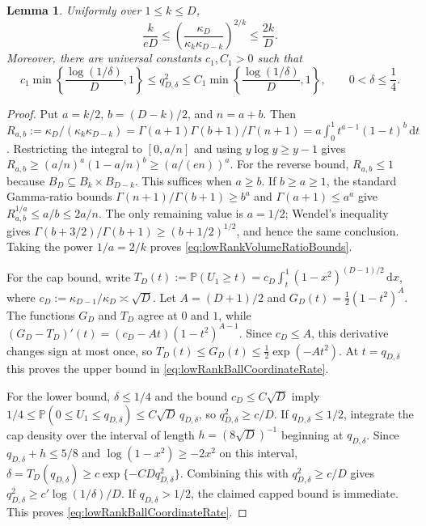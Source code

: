 \documentclass[11pt]{article}
\newtheorem{lemma}[theorem]{Lemma}
\theoremstyle{definition}
\theoremstyle{remark}
\newcommand{\1}{\boldsymbol{1}}
\begin{document}
\begin{lemma}
\label{lem:ballVolumeAndCapBounds}
Uniformly over $1\leq k\leq D$,
\begin{equation}
\frac{k}{eD}
\leq
\left(
\frac{\kappa_D}{\kappa_k\kappa_{D-k}}
\right)^{2/k}
\leq
\frac{2k}{D}.
\label{eq:lowRankVolumeRatioBounds}
\end{equation}
Moreover, there are universal constants $c_1,C_1>0$ such that
\begin{equation}
c_1\min\left\{\frac{\log(1/\delta)}D,1\right\}
\leq
q_{D,\delta}^2
\leq
C_1\min\left\{\frac{\log(1/\delta)}D,1\right\},
\qquad
0<\delta\leq\frac14.
\label{eq:lowRankBallCoordinateRate}
\end{equation}
\end{lemma}

\begin{proof}
Put $a=k/2$, $b=(D-k)/2$, and $n=a+b$. Then
\(R_{a,b}:=\kappa_D/(\kappa_k\kappa_{D-k})
=\Gamma(a+1)\Gamma(b+1)/\Gamma(n+1)
=a\int_0^1t^{a-1}(1-t)^b\,\mathrm dt\).
Restricting the integral to $[0,a/n]$ and using
$y\log y\geq y-1$ gives
\(R_{a,b}\geq(a/n)^a(1-a/n)^b\geq(a/(en))^a\).
For the reverse bound, $R_{a,b}\leq1$ because
$B_D\subseteq B_k\times B_{D-k}$. This suffices when $a\geq b$. If
$b\geq a\geq1$, the standard Gamma-ratio bounds
\(\Gamma(n+1)/\Gamma(b+1)\geq b^a\) and
\(\Gamma(a+1)\leq a^a\) give
\(R_{a,b}^{1/a}\leq a/b\leq2a/n\).
The only remaining value is $a=1/2$; Wendel's inequality gives
\(\Gamma(b+3/2)/\Gamma(b+1)\geq(b+1/2)^{1/2}\),
and hence the same conclusion. Taking the power $1/a=2/k$ proves
\eqref{eq:lowRankVolumeRatioBounds}.

For the cap bound, write
\(T_D(t):=\mathbb P(U_1\geq t)
=c_D\int_t^1(1-x^2)^{(D-1)/2}\,\mathrm dx\), where
\(c_D:=\kappa_{D-1}/\kappa_D\asymp\sqrt D\).
Let $A=(D+1)/2$ and $G_D(t)=\tfrac12(1-t^2)^A$. The functions
$G_D$ and $T_D$ agree at $0$ and $1$, while
\((G_D-T_D)'(t)=(c_D-At)(1-t^2)^{A-1}\).
Since $c_D\leq A$, this derivative changes sign at most once, so
\(T_D(t)\leq G_D(t)\leq\frac12\exp(-At^2)\).
At $t=q_{D,\delta}$ this proves the upper bound in
\eqref{eq:lowRankBallCoordinateRate}.

For the lower bound, $\delta\leq1/4$ and the bound
$c_D\leq C\sqrt D$ imply
\(1/4\leq\mathbb P(0\leq U_1\leq q_{D,\delta})
\leq C\sqrt D\,q_{D,\delta}\),
so $q_{D,\delta}^2\geq c/D$. If $q_{D,\delta}\leq1/2$, integrate the
cap density over the interval of length $h=(8\sqrt D)^{-1}$ beginning at
$q_{D,\delta}$. Since $q_{D,\delta}+h\leq5/8$ and
$\log(1-x^2)\geq-2x^2$ on this interval,
\(\delta=T_D(q_{D,\delta})\geq
c\exp\{-CDq_{D,\delta}^2\}\).
Combining this with $q_{D,\delta}^2\geq c/D$ gives
\(q_{D,\delta}^2\geq c'\log(1/\delta)/D\).
If $q_{D,\delta}>1/2$, the claimed capped bound is immediate. This proves
\eqref{eq:lowRankBallCoordinateRate}.
\end{proof}
\end{document}
